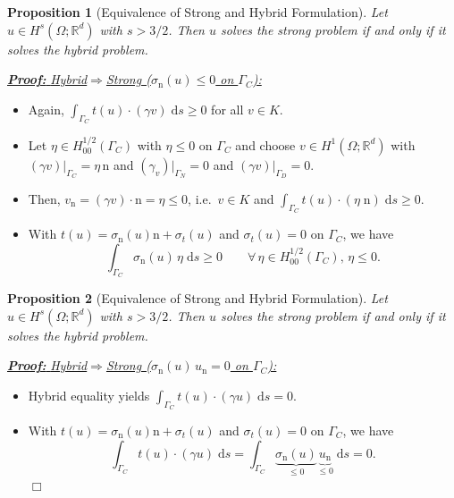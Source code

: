 \documentclass[10pt,aspectratio=169]{beamer}
\newtheorem{proposition}{Proposition}[section]
\def\R{{\mathbb R}}
\def\d{{\mathrm{d}}}
\def\ds{{\d s}}
\def\eop{\hfill{$\Box$}}
\begin{document}
\begin{frame}
	\begin{proposition}[Equivalence of Strong and Hybrid Formulation]
		Let $u\in H^s(\Omega;\R^d)$ with $s>3/2$. Then $u$ solves the strong problem if and only if it solves the hybrid problem.
	\end{proposition}
	\underline{\textbf{\em Proof:} {\em Hybrid\enspace}$\Longrightarrow${\em\enspace Strong ($\sigma_\mathrm{n}(u)\le 0$ on $\Gamma_C$):}}
	\begin{itemize}
		\item Again, $\displaystyle \int_{\Gamma_C} t(u)\cdot (\gamma v)\;\ds \ge 0$ for all $v\in K$.
		\item Let $\eta\in H_{00}^{1/2}(\Gamma_C)$ with $\eta\le 0$ on $\Gamma_C$ and choose $v\in H^1(\Omega;\R^d)$ with $(\gamma v)|_{\Gamma_C} = \eta\,\mathrm{n}$ and $(\gamma_v)|_{\Gamma_N} = 0$ and $(\gamma v)|_{\Gamma_D} = 0$.
		\item Then, $v_\mathrm{n} = (\gamma v)\cdot\mathrm{n} = \eta\le 0$, i.e.\ $v\in K$ and $\displaystyle \int_{\Gamma_C}t(u)\cdot(\eta\;\mathrm{n})\;\ds\ge 0$.
		\item With $t(u)=\sigma_\mathrm{n}(u)\mathrm{n}+\sigma_t(u)$ and $\sigma_t(u) = 0$ on $\Gamma_C$, we have
		      \begin{equation*}
			      \int_{\Gamma_C}\sigma_\mathrm{n}(u)\,\eta\;\ds \ge 0\qquad \forall\,\eta\in H_{00}^{1/2}(\Gamma_C),\, \eta \le 0.
		      \end{equation*}
	\end{itemize}
\end{frame}

\begin{frame}
	\begin{proposition}[Equivalence of Strong and Hybrid Formulation]
		Let $u\in H^s(\Omega;\R^d)$ with $s>3/2$. Then $u$ solves the strong problem if and only if it solves the hybrid problem.
	\end{proposition}
	\underline{\textbf{\em Proof:} {\em Hybrid\enspace}$\Longrightarrow${\em\enspace Strong ($\sigma_\mathrm{n}(u)\,u_\mathrm{n} = 0$ on $\Gamma_C$):}}
	\begin{itemize}
		\item Hybrid equality yields $\displaystyle \int_{\Gamma_C} t(u)\cdot(\gamma u)\;\ds = 0$.
		\item With $t(u)=\sigma_\mathrm{n}(u)\mathrm{n}+\sigma_t(u)$ and $\sigma_t(u) = 0$ on $\Gamma_C$, we have
		      \begin{equation*}
			      \int_{\Gamma_C} t(u)\cdot(\gamma u)\;\ds  = \int_{\Gamma_C} \underbrace{\sigma_\mathrm{n}(u)}_{\le 0}\underbrace{u_\mathrm{n}}_{\le 0}\;\ds = 0.
		      \end{equation*}\eop
	\end{itemize}
\end{frame}
\end{document}
